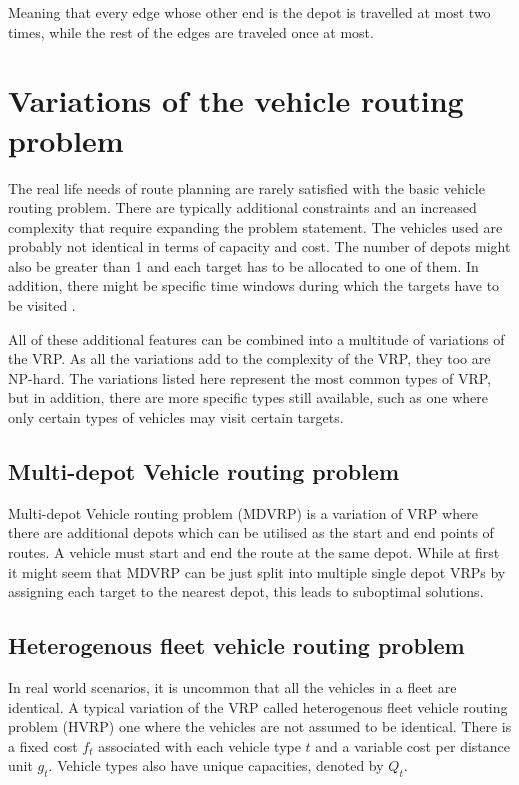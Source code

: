 \noindent
Meaning that every edge whose other end is the depot is travelled at most two times, while the rest of the edges are traveled once at most. \cite{laporte2007you}







\section{Variations of the vehicle routing problem}

The real life needs of route planning are rarely satisfied with the basic vehicle routing problem. There are typically additional constraints and an increased complexity that require expanding the problem statement. The vehicles used are probably not identical in terms of capacity and cost. The number of depots might also be greater than 1 and each target has to be allocated to one of them. \cite{salhi2014multi} In addition, there might be specific time windows during which the targets have to be visited \cite{ghoseiri2010multi}. 

All of these additional features can be combined into a multitude of variations of the VRP. As all the variations add to the complexity of the VRP, they too are NP-hard. The variations listed here represent the most common types of VRP, but in addition, there are more specific types still available, such as one where only certain types of vehicles may visit certain targets. \cite{montoya2015literature} 


\subsection{Multi-depot Vehicle routing problem}

Multi-depot Vehicle routing problem (MDVRP) is a variation of VRP where there are additional depots which can be utilised as the start and end points of routes. A vehicle must start and end the route at the same depot. While at first it might seem that MDVRP can be just split into multiple single depot VRPs by assigning each target to the nearest depot, this leads to suboptimal solutions. \cite {salhi2014multi}


\subsection{Heterogenous fleet vehicle routing problem}

In real world scenarios, it is uncommon that all the vehicles in a fleet are identical. A typical variation of the VRP called heterogenous fleet vehicle routing problem (HVRP) one where the vehicles are not assumed to be identical. There is a fixed cost $f_t$ associated with each vehicle type $t$ and a variable cost per distance unit $g_t$. Vehicle types also have unique capacities, denoted by $Q_t$. \cite{gendreau1999tabu}


